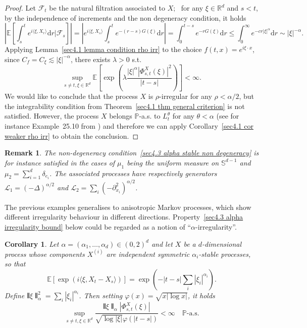 \documentclass[10pt]{article}
\newcommand{\mathd}{\mathrm{d}}
\newcommand{\nobracket}{}
\newtheorem{corollary}[theorem]{Corollary}
\newtheorem{remark}[theorem]{Remark}
\begin{document}
\begin{proof}
  Let $\mathcal{F}_t$ be the natural filtration associated to $X$; \ for any
  $\xi \in \mathbb{R}^d$ and $s < t$, by the independence of increments and
  the non degeneracy condition, it holds
  \[ \left| \mathbb{E} \left[ \int_s^t e^{i \langle \xi, X_r \rangle} \mathd r
     | \mathcal{F}_s \nobracket \right] \right| = \left| e^{i \langle \xi, X_s
     \rangle} \int_s^t e^{- (r - s) G (\xi)} \mathd r \right| = \int_0^{t - s}
     e^{- r G (\xi)} \mathd r \leqslant \int_0^{\infty} e^{- c r | \xi
     |^{\alpha}} \mathd r \sim | \xi |^{- \alpha} . \]
  Applying Lemma~\ref{sec4.1 lemma condition rho irr} to the choice $f (t, x)
  = e^{i \xi \cdot x}$, since $C_f = C_{\xi} \lesssim | \xi |^{- \alpha}$,
  there exists $\lambda > 0$ s.t.
  \[ \sup_{s \neq t, \xi \in \mathbb{R}^d} \mathbb{E} \left[ \exp \left(
     \lambda \frac{| \xi |^{\alpha}  | \Phi_{s, t}^X (\xi) |^2}{| t - s |}
     \right) \right] < \infty . \]
  We would like to conclude that the process $X$ is $\rho$-irregular for any
  $\rho < \alpha / 2$, but the integrability condition from
  Theorem~\ref{sec4.1 thm general criterion} is not satisfied. However, the
  process $X$ belongs $\mathbb{P}$-a.s. to $L^{\theta}_t$ for any $\theta <
  \alpha$ (see for instance Example~25.10 from {\cite{sato}}) and therefore we
  can apply Corollary~\ref{sec4.1 cor weaker rho irr} to obtain the
  conclusion.
\end{proof}

\begin{remark}
  The non\mbox{-}degeneracy condition~\eqref{sec4.3 alpha stable non
  degeneracy} is for instance satisfied in the cases of $\mu_1$ being the
  uniform measure on $\mathbb{S}^{d - 1}$ and $\mu_2 = \sum_{i = 1}^d
  \delta_{e_i}$. The associated processes have respectively generators
  $\mathcal{L}_1 = (- \Delta)^{\alpha / 2}$ and $\mathcal{L}_2 = \sum_i (-
  \partial_{x_i}^2)^{\alpha / 2}$.
\end{remark}

The previous examples generalises to anisotropic Markov processes, which show
different irregularity behaviour in different directions.
Property~\eqref{sec4.3 alpha irregularity bound} below could be regarded as a
notion of ``$\alpha$\mbox{-}irregularity''.

\begin{corollary}
  Let $\alpha = (\alpha_1, \ldots, \alpha_d) \in (0, 2)^d$ and let $X$ be a
  $d$\mbox{-}dimensional process whose components $X^{(i)}$ are independent symmetric
  $\alpha_i$-stable processes, so that
  \[ \mathbb{E} [\exp (i \langle \xi, X_t - X_s \rangle)] = \exp \left( - | t
     - s | \sum_i | \xi_i |^{\alpha_i} \right) . \]
  Define $\interleave \xi \interleave^2_{\alpha} = \sum_i | \xi_i
  |^{\alpha_i}$. Then setting $\varphi (x) = \sqrt{x | \log x |}$, it holds
  \begin{equation}
    \sup_{s \neq t, \xi \in \mathbb{R}^d} \frac{\interleave \xi
    \interleave_{\alpha} | \Phi^X_{s, t} (\xi) |}{\sqrt{\log | \xi |} \varphi
    (| t - s |)} < \infty \quad \mathbb{P} \text{-a.s.} \label{sec4.3 alpha
    irregularity bound}
  \end{equation}
\end{corollary}
\end{document}
